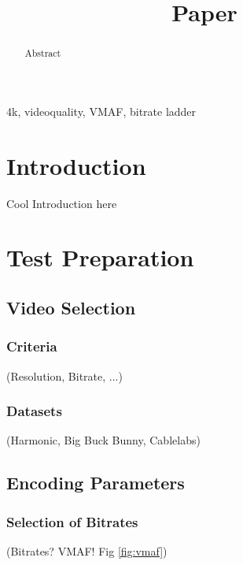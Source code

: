 \documentclass[conference]{IEEEtran}
\begin{document}
\title{Paper}

\author{
\and
{}
\IEEEauthorblockA{}
\and
{}
}

\maketitle

\begin{abstract}
Abstract
\end{abstract}

\begin{IEEEkeywords}
4k, videoquality, VMAF, bitrate ladder
\end{IEEEkeywords}

\section{Introduction}
Cool Introduction here

\section{Test Preparation}
\subsection{Video Selection}
\subsubsection{Criteria}
(Resolution, Bitrate, ...)

\subsubsection{Datasets}
(Harmonic, Big Buck Bunny, Cablelabs)

\subsection{Encoding Parameters}
\subsubsection{Selection of Bitrates}
(Bitrates? VMAF! Fig \ref{fig:vmaf})
\end{document}
